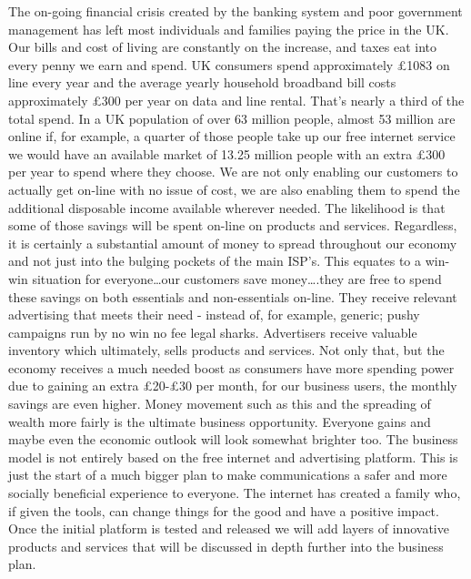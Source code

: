 \documentclass[letterpaper,10pt,openany,oneside,english]{sphinxmanual}
\begin{document}
The on-going financial crisis created by the banking system and poor government management
has left most individuals and families paying the price in the UK.
Our bills and cost of living are constantly on the increase, and taxes eat into every penny we
earn and spend.
UK consumers spend approximately £1083 on line every year and the average yearly household
broadband bill costs approximately £300 per year on data and line rental.
That’s nearly a third of the total spend. In a UK population of over 63 million people, almost 53
million are online if, for example, a quarter of those people take up our free internet service we
would have an available market of 13.25 million people with an extra £300 per year to spend
where they choose. We are not only enabling our customers to actually get on-line with no
issue of cost, we are also enabling them to spend the additional disposable income available
wherever needed. The likelihood is that some of those savings will be spent on-line on products
and services. Regardless, it is certainly a substantial amount of money to spread throughout our
economy and not just into the bulging pockets of the main ISP’s.
This equates to a win-win situation for everyone…our customers save money….they are free to
spend these savings on both essentials and non-essentials on-line. They receive relevant
advertising that meets their need - instead of, for example, generic; pushy campaigns run by no
win no fee legal sharks. Advertisers receive valuable inventory which ultimately, sells products
and services.
Not only that, but the economy receives a much needed boost as consumers have more
spending power due to gaining an extra £20-£30 per month, for our business users, the monthly
savings are even higher. Money movement such as this and the spreading of wealth more fairly
is the ultimate business opportunity. Everyone gains and maybe even the economic outlook will
look somewhat brighter too.
The business model is not entirely based on the free internet and advertising platform. This is
just the start of a much bigger plan to make communications a safer and more socially
beneficial experience to everyone. The internet has created a family who, if given the tools, can
change things for the good and have a positive impact. Once the initial platform is tested and
released we will add layers of innovative products and services that will be discussed in depth
further into the business plan.
\end{document}
